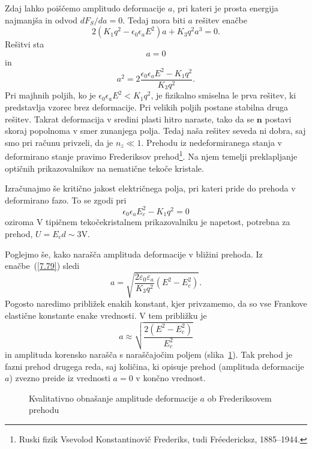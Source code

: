 Zdaj lahko poiščemo amplitudo deformacije $a$, pri kateri je prosta energija
najmanjša in odvod $dF_S/da=0$. Tedaj mora biti $a$ rešitev enačbe 
\begin{equation}
2(K_{1}q^{2}-\epsilon_{0}\epsilon_{a}E^2)a+K_{3}q^{2}a^{3}=0.
\label{7.78}
\end{equation}
 Rešitvi sta 
\begin{equation}
a=0
\end{equation}
in
\begin{equation}
a^{2}=2\frac{\epsilon_{0}\epsilon_{a}E^2-K_{1}q^{2}}{K_{3}q^{2}}.
\label{7.79}
\end{equation}
 Pri majhnih poljih, ko je $\epsilon_{0}\epsilon_{a}E^2<K_{1}q^{2}$,
je fizikalno smiselna le prva rešitev, ki predstavlja vzorec brez deformacije. Pri 
velikih poljih postane stabilna druga rešitev. Takrat deformacija
v sredini plasti hitro naraste, tako da se $\mathbf{n}$ postavi skoraj
popolnoma v smer zunanjega polja. Tedaj naša rešitev seveda ni dobra,
saj smo pri računu privzeli, da je $n_{z}\ll1$. Prehodu iz nedeformiranega
stanja v deformirano stanje pravimo  Frederiksov prehod\footnote{Ruski fizik
Vsevolod Konstantinovič Frederiks, tudi Fr\'{e}edericksz, 1885--1944.}. Na njem
temelji preklapljanje optičnih prikazovalnikov na nematične tekoče kristale.

Izračunajmo še kritično jakost električnega polja, pri kateri pride do prehoda v deformirano fazo.
To se zgodi pri 
\begin{equation}
\epsilon_{0}\epsilon_{a}E_c^2-K_{1}q^{2} = 0
\end{equation}
oziroma
V tipičnem tekočekristalnem prikazovalniku je napetost, potrebna za prehod, $U = E_cd \sim 3 \si{\volt}$. 

Poglejmo še, kako narašča amplituda deformacije v bližini prehoda. Iz enačbe~(\ref{7.79})
sledi 
\begin{equation}
a = \sqrt{\frac{2 \varepsilon_0 \varepsilon_a}{K_3 q^2 }(E^2-E_c^2)}.
\end{equation}
Pogosto naredimo približek enakih konstant, kjer privzamemo, da so vse Frankove 
elastične konstante enake vrednosti. V tem približku je 
\begin{equation}
a \approx \sqrt{\frac{2(E^2-E_c^2)}{E_c^2}}
\end{equation}
in amplituda korensko narašča s naraščajočim poljem (slika~\ref{Fred}). Tak prehod je
fazni prehod drugega reda, saj količina, ki opisuje prehod (amplituda deformacije $a$)
zvezno preide iz vrednosti $a=0$ v končno vrednost. 
\begin{figure}[h]
\centering
\def\svgwidth{80truemm} 

\caption{Kvalitativno obnašanje amplitude deformacije $a$ ob Frederiksovem prehodu}
\label{Fred}
\end{figure}

